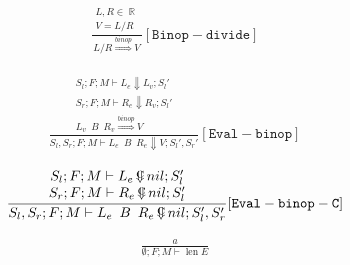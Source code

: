 \documentclass{scrartcl}
\DeclareMathOperator{\lenop}{len}
\DeclareMathOperator{\numtype}{\mathbb{R}}
\DeclareMathOperator{\ceval}{\overset{C}{\smash{\Downarrow}}}
\begin{document}
    \begin{align*}
    \frac{
        \begin{matrix}
        L, R \in \numtype \\
        V = L / R
        \end{matrix}
    }{
        L / R \overset{binop}{\Rightarrow} V
    }[\mathtt{Binop-divide}]
    \end{align*}
    
    \begin{align*}
    \frac{
        \begin{matrix}
        S_l; F; M \vdash L_e \Downarrow L_v; S_l' \\
        S_r; F; M \vdash R_e \Downarrow R_v; S_l' \\
        L_v \enspace B \enspace R_v \overset{binop}{\Rightarrow} V
        \end{matrix}
    }{
        S_l, S_r; F; M \vdash L_e \enspace B \enspace R_e \Downarrow V; S_l', S_r'
    }[\mathtt{Eval-binop}]
    \end{align*}
    
    \begin{align*}
    \frac{
        \begin{matrix}
        S_l; F; M \vdash L_e  \ceval nil; S_l' \\
        S_r; F; M \vdash R_e  \ceval nil; S_l' \\
        \end{matrix}
    }{
        S_l, S_r; F; M \vdash L_e \enspace B \enspace R_e  \ceval nil; S_l', S_r'
    }[\mathtt{Eval-binop-C}]
    \end{align*}
    
    \begin{align*}
    \frac{
        a
    }{
        \emptyset; F; M \vdash \lenop E
    }
    \end{align*}
    
\end{document}
